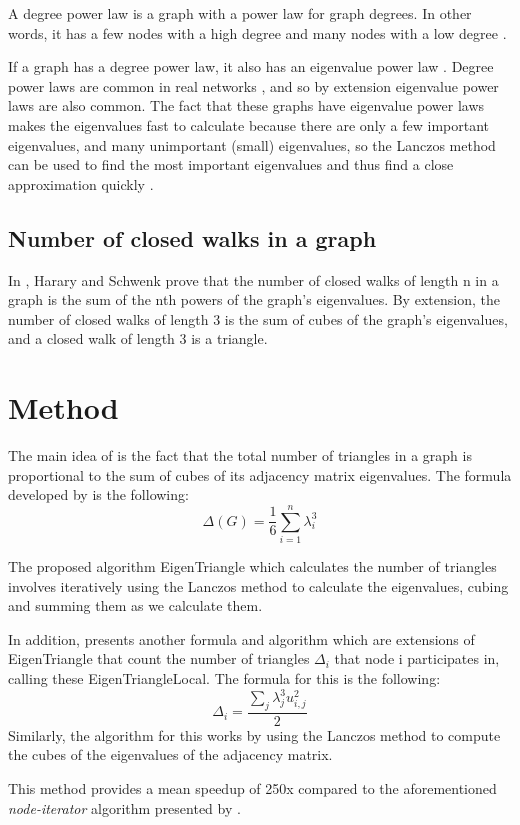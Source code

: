 \documentclass{acm_proc_article-sp}
\begin{document}
A degree power law is a graph with a power law for graph degrees. In other
words, it has a few nodes with a high degree and many nodes with a low degree
\cite{mihail}.

If a graph has a degree power law, it also has an eigenvalue power law
\cite{mihail}. Degree power laws are common in real networks \cite{original},
and so by extension eigenvalue power laws are also common. The fact that
these graphs have eigenvalue power laws makes the eigenvalues fast to calculate
because there are only a few important eigenvalues, and many unimportant
(small) eigenvalues, so the Lanczos method can be used to find the most
important eigenvalues and thus find a close approximation quickly \cite{original}.

\subsection{Number of closed walks in a graph}
In \cite{harary}, Harary and Schwenk prove that the number of closed walks of
length n in a graph is the sum of the nth powers of the graph's eigenvalues. By
extension, the number of closed walks of length 3 is the sum of cubes of the
graph's eigenvalues, and a closed walk of length 3 is a triangle.

\section{Method}
The main idea of \cite{original} is the fact that the total number of triangles
in a graph is proportional to the sum of cubes of its adjacency matrix
eigenvalues. The formula developed by \cite{original} is the following:
$$\Delta(G) = \frac{1}{6} \sum_{i=1}^n \lambda_i^3$$

The proposed algorithm EigenTriangle which calculates the number of triangles
involves
iteratively using the Lanczos method to calculate the eigenvalues, cubing and
summing them as we calculate them.

In addition, \cite{original} presents another formula and algorithm which are
extensions of EigenTriangle that count the number of triangles $\Delta_i$ that
node i participates in, calling these EigenTriangleLocal. The formula for this
is the following: $$\Delta_i = \frac{\sum_j \lambda_j^3 u_{i,j}^2}{2}$$
Similarly, the
algorithm for this works by using the Lanczos method to compute the cubes of the
eigenvalues of the adjacency matrix.

This method provides a mean speedup of 250x compared to the aforementioned
\textit{node-iterator} algorithm presented by \cite{schank:counting}.
\end{document}
